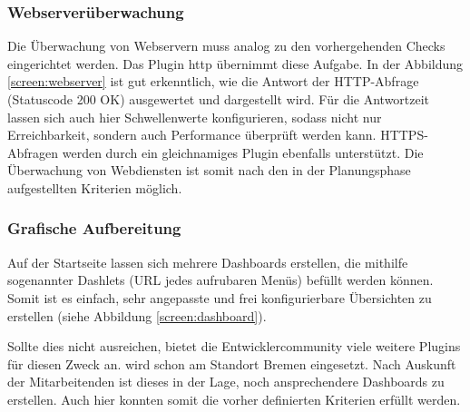 \subsubsection{Webserverüberwachung}
\label{sec:ÜberwachungWebserver}
Die Überwachung von Webservern muss analog zu den vorhergehenden Checks eingerichtet werden. Das Plugin \glqq{}http\grqq{} übernimmt diese Aufgabe.  In der Abbildung \ref{screen:webserver} ist gut erkenntlich, wie die Antwort der HTTP-Abfrage (Statuscode 200 OK) ausgewertet und dargestellt wird. Für die Antwortzeit lassen sich auch hier Schwellenwerte konfigurieren, sodass nicht nur Erreichbarkeit, sondern auch Performance überprüft werden kann. HTTPS-Abfragen werden durch ein gleichnamiges Plugin ebenfalls unterstützt. Die Überwachung von Webdiensten ist somit nach den in der Planungsphase aufgestellten Kriterien möglich.

\subsubsection{Grafische Aufbereitung}
\label{sec:GrafischeAufbereitung}
Auf der Startseite lassen sich mehrere Dashboards erstellen, die mithilfe sogenannter \glqq{}Dashlets\grqq{} (URL jedes aufrubaren Menüs) befüllt werden können. Somit ist es einfach, sehr angepasste  und frei konfigurierbare Übersichten zu erstellen (siehe Abbildung \ref{screen:dashboard}).

Sollte dies nicht ausreichen, bietet die Entwicklercommunity viele weitere Plugins für diesen Zweck an.  wird schon am Standort Bremen eingesetzt. Nach Auskunft der Mitarbeitenden ist dieses in der Lage, noch ansprechendere Dashboards zu erstellen. Auch hier konnten somit die vorher definierten Kriterien erfüllt werden.